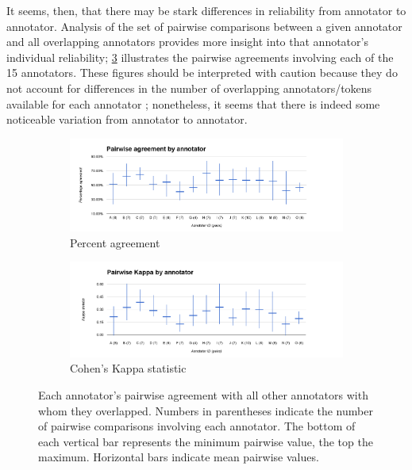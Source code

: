 	
	
	 It seems, then, that there may be stark differences in reliability from annotator to annotator. Analysis of the set of pairwise comparisons between a given annotator and all overlapping annotators provides more insight into that annotator's individual reliability; \cref{fig:agreement:annotators} illustrates the pairwise agreements involving each of the 15 annotators. These figures should be interpreted with caution because they do not account for differences in the number of overlapping annotators/tokens available for each annotator ; nonetheless, it seems that there is indeed some noticeable variation from annotator to annotator. %
		
		\begin{figure}[htb]
			\centering
			
			\begin{subfigure}[b]{\textwidth}
				\centering
				\includegraphics[width=\textwidth]{img/annotation/pairAgreeAnnotators}
				\caption{Percent agreement}
				\label{fig:agreement:annotators:pct}
			\end{subfigure}%
			
			\begin{subfigure}[b]{\textwidth}
				\centering
				\includegraphics[width=\textwidth]{img/annotation/pairKappaAnnotators}
				\caption{Cohen's Kappa statistic}
				\label{fig:agreement:annotators:k}
			\end{subfigure}%
			
			\caption[Pairwise agreement statistics by annotator]{Each annotator's pairwise agreement with all other annotators with whom they overlapped. Numbers in parentheses indicate the number of pairwise comparisons involving each annotator. The bottom of each vertical bar represents the minimum pairwise value, the top the maximum. Horizontal bars indicate mean pairwise values.}
			\label{fig:agreement:annotators}
		\end{figure}
		
